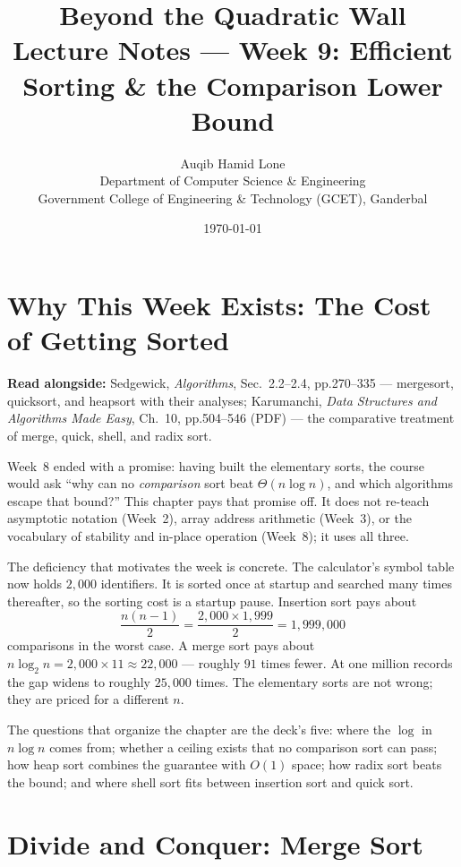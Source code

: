 \documentclass[11pt]{article}
\title{Beyond the Quadratic Wall\\\large Lecture Notes --- Week 9: Efficient Sorting \& the Comparison Lower Bound}
\author{Auqib Hamid Lone\\[0.3em]
  \small Department of Computer Science \& Engineering\\
  \small Government College of Engineering \& Technology (GCET), Ganderbal}
\date{\today}
\begin{document}
\maketitle

\section{Why This Week Exists: The Cost of Getting Sorted}

\textbf{Read alongside:} Sedgewick, \textit{Algorithms}, Sec.~2.2--2.4, pp.270--335 --- mergesort, quicksort, and heapsort with their analyses; Karumanchi, \textit{Data Structures and Algorithms Made Easy}, Ch.~10, pp.504--546 (PDF) --- the comparative treatment of merge, quick, shell, and radix sort.

Week~8 ended with a promise: having built the elementary sorts, the course would ask ``why can no \emph{comparison} sort beat $\Theta(n \log n)$, and which algorithms escape that bound?'' This chapter pays that promise off. It does not re-teach asymptotic notation (Week~2), array address arithmetic (Week~3), or the vocabulary of stability and in-place operation (Week~8); it uses all three.

The deficiency that motivates the week is concrete. The calculator's symbol table now holds $2{,}000$ identifiers. It is sorted once at startup and searched many times thereafter, so the sorting cost is a startup pause. Insertion sort pays about
\[
  \frac{n(n-1)}{2} = \frac{2{,}000 \times 1{,}999}{2} = 1{,}999{,}000
\]
comparisons in the worst case. A merge sort pays about $n\log_2 n = 2{,}000 \times 11 \approx 22{,}000$ --- roughly $91$ times fewer. At one million records the gap widens to roughly $25{,}000$ times. The elementary sorts are not wrong; they are priced for a different $n$.

The questions that organize the chapter are the deck's five: where the $\log$ in $n\log n$ comes from; whether a ceiling exists that no comparison sort can pass; how heap sort combines the guarantee with $O(1)$ space; how radix sort beats the bound; and where shell sort fits between insertion sort and quick sort.


\section{Divide and Conquer: Merge Sort}
\end{document}
